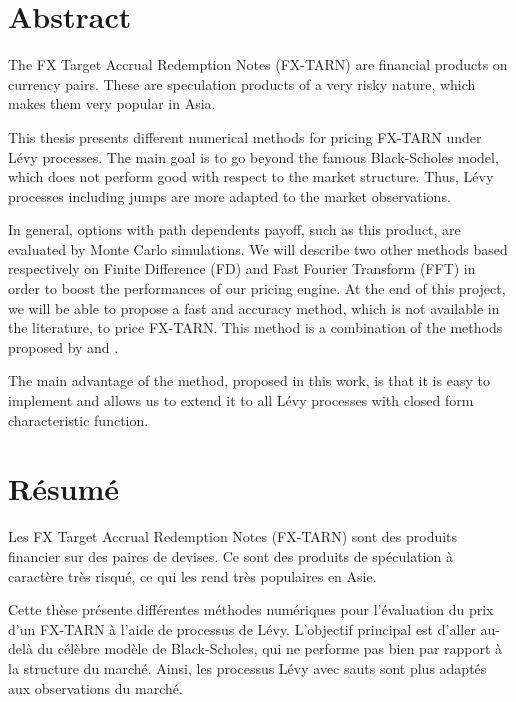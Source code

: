 
%
\chapter*{Abstract}
\label{sec:abstract}

The FX Target Accrual Redemption Notes (FX-TARN) are financial products on currency pairs. These are speculation products of a very risky nature, which makes them very popular in Asia. 

This thesis presents different numerical methods for pricing FX-TARN under L\'evy processes. The main goal is to go beyond the famous Black-Scholes model, which does not perform good with respect to the market structure. Thus, L\'evy processes including jumps are more adapted to the market observations.

In general, options with path dependents payoff, such as this product, are evaluated by Monte Carlo simulations. We will describe two other methods based respectively on Finite Difference (FD) and Fast Fourier Transform (FFT) in order to boost the performances of our pricing engine. At the end of this project, we will be able to propose a fast and accuracy method, which is not available in the literature, to price FX-TARN. This method is a combination of the methods proposed by \citeauthor{LS15} \citeyearpar{LS15} \cite{LS15} and \citeauthor{Lor+08} \citeyearpar{Lor+08} \cite{Lor+08}. 

The main advantage of the method, proposed in this work, is that it is easy to implement and allows us to extend it to all L\'evy processes with closed form characteristic function.

\chapter*{Résumé}

Les FX Target Accrual Redemption Notes (FX-TARN) sont des produits financier sur des paires de devises. Ce sont des produits de spéculation à caractère très risqué, ce qui les rend très populaires en Asie.

Cette thèse présente différentes méthodes numériques pour l'évaluation du prix d'un FX-TARN à l'aide de processus de Lévy. L'objectif principal est d'aller au-delà du célèbre modèle de Black-Scholes, qui ne performe pas bien par rapport à la structure du marché. Ainsi, les processus Lévy avec sauts sont plus adaptés aux observations du marché.

